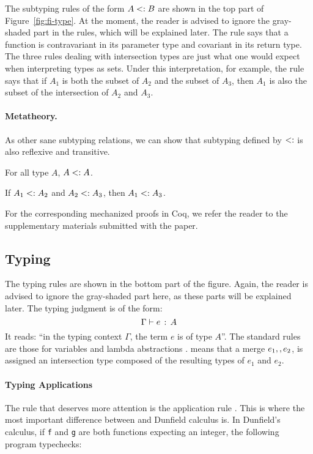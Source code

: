 The subtyping rules of the form $A <: B$ are shown in the top part of
Figure~\ref{fig:fi-type}. At the moment, the reader is advised to ignore the
gray-shaded part in the rules, which will be explained later. The rule
 says that a function is contravariant in its parameter
type and covariant in its return type. The three rules dealing with
intersection types are just what one would expect when interpreting types as
sets. Under this interpretation, for example, the rule 
says that if $A_1$ is both the subset of $A_2$ and the subset of $A_3$, then
$A_1$ is also the subset of the intersection of $A_2$ and $A_3$.

\paragraph{Metatheory.} As other sane subtyping relations, we can show that
subtyping defined by $<:$ is also reflexive and transitive.

\begin{lemma} \label{lemma:sub-refl}
  For all type $ A $, $ A <: A $.
\end{lemma}

\begin{lemma} \label{lemma:sub-trans}
  If $ A_1 <: A_2 $ and $ A_2 <: A_3 $,
  then $ A_1 <: A_3 $.
\end{lemma}

For the corresponding mechanized proofs in Coq, we refer the reader to the
supplementary materials submitted with the paper.

\subsection{Typing}

The typing rules are shown in the bottom part of the figure. Again,
the reader is advised to ignore the gray-shaded part here, as these
parts will be explained later. The typing judgment is of the form:
\[ \Gamma \vdash e \ \!:\! \ A \]
It reads: ``in the typing context $\Gamma$, the term $e$ is of type
$A$''. The standard rules are those for variables
 and lambda abstractions
.  means that a merge
$e_1 ,, e_2$, is assigned an intersection type composed of the
resulting types of $e_1$ and $e_2$.

\paragraph{Typing Applications} 
The rule that deserves more attention is the application rule
.  This is where the most important difference between
\name and Dunfield calculus is. In Dunfield's calculus, if
\lstinline$f$ and \lstinline$g$ are both functions expecting an
integer, the following program typechecks:

